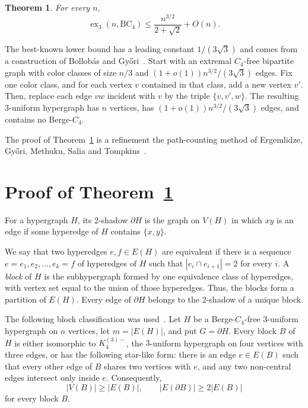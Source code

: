 \documentclass[11pt]{article}
\newtheorem{theorem}{Theorem}
\newcommand{\ex}{\operatorname{ex}}
\newcommand{\BC}{\mathrm{BC}}
\begin{document}
\begin{theorem}\label{thm:main}
For every $n$,
\[
        \ex_3(n,\BC_4)\le \frac{n^{3/2}}{2+\sqrt2}+O(n).
\]
\end{theorem}

The best-known lower bound has a leading constant $1/(3\sqrt3)$ and comes from
a construction of Bollob\'as and Gy\H{o}ri~\cite{bollobas2008pentagons}.
Start with an extremal $C_4$-free bipartite graph with color classes of size
$n/3$ and $(1+o(1))n^{3/2}/(3\sqrt3)$ edges.  Fix one color class, and for each vertex $v$ contained in that class, add a new vertex $v'$.  Then, replace each edge $vw$ incident with $v$ by the triple $\{v,v',w\}$.  The resulting $3$-uniform hypergraph has
$n$ vertices, has $(1+o(1))n^{3/2}/(3\sqrt3)$ edges, and contains no
Berge-$C_4$.



The proof of Theorem~\ref{thm:main} is a refinement the path-counting method of Ergemlidze, Gy\H{o}ri,
Methuku, Salia and Tompkins~\cite{ergemlidze20203}.





\section{Proof of Theorem~\ref{thm:main}}
For a hypergraph $H$, its $2$-shadow $\partial H$ is the graph on $V(H)$ in which $xy$ is an edge if some hyperedge of $H$ contains $\{x,y\}$.

We say that two hyperedges $e,f\in E(H)$ are equivalent if there is a sequence $e=e_1,e_2,\ldots,e_k=f$ of hyperedges of $H$ such that $|e_i\cap e_{i+1}|=2$ for every $i$. A \emph{block} of $H$ is the subhypergraph formed by one equivalence class of hyperedges, with vertex set equal to the union of those hyperedges. Thus, the blocks form a partition of $E(H)$. Every edge of $\partial H$ belongs to the $2$-shadow of a unique block.

The following block classification was used~\cite{ergemlidze20203}.
Let $H$ be a Berge-$C_4$-free $3$-uniform hypergraph on $n$ vertices, let $m=|E(H)|$, and put $G=\partial H$.  Every block $B$ of $H$ is either isomorphic to
$K_4^{(3)-}$, the $3$-uniform hypergraph on four vertices with three edges, or has the
following star-like form: there is an edge $e\in E(B)$ such that every other
edge of $B$ shares two vertices with $e$, and any two non-central edges
intersect only inside $e$.
Consequently,
\begin{equation}\label{Eq:block}
        |V(B)|\ge |E(B)|,
        \qquad
        |E(\partial B)|\ge 2|E(B)|
\end{equation}
for every block $B$. 
\end{document}
